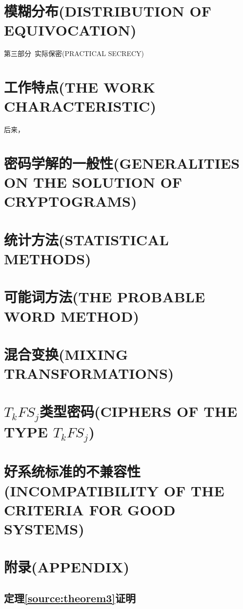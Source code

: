 \documentclass[]{article}
\begin{document}
\section{模糊分布(DISTRIBUTION OF EQUIVOCATION)}

\begin{center}
	\Large{第三部分\ 实际保密(PRACTICAL SECRECY)}
\end{center}

\section{工作特点(THE WORK CHARACTERISTIC)}
后来，
\section{密码学解的一般性(GENERALITIES ON THE SOLUTION OF CRYPTOGRAMS)}

\section{统计方法(STATISTICAL METHODS)}


\section{可能词方法(THE PROBABLE WORD METHOD)}

\section{混合变换(MIXING TRANSFORMATIONS)}

\section{$T_k F S_j$类型密码(CIPHERS OF THE TYPE $T_k F S_j$)}

\section{好系统标准的不兼容性(INCOMPATIBILITY OF THE CRITERIA FOR GOOD SYSTEMS)}

\section*{附录(APPENDIX)}
\subsection*{定理\ref{source:theorem3}证明}
\end{document}
